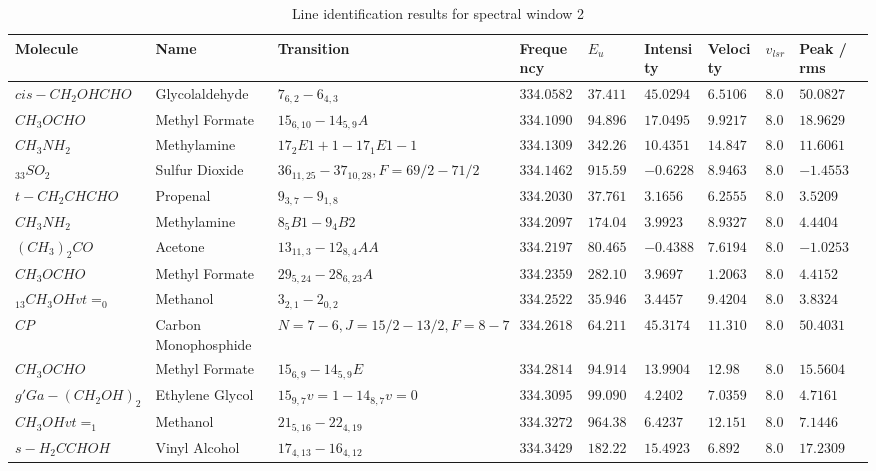 \documentclass{aa}
\begin{document}
   \begin{table}   
 \label{table:3}  
    \caption{Line identification results for spectral window 2}
    \tiny
    \centering    
    \begin{tabular}{l l l l l l l l l} 
    \hline     
    Molecule & Name &Transition & Frequency & $E_{u}$ & Intensity & Velocity & $v_{lsr}$ & Peak / rms\\ 
    \hline
$cis-CH_{2}OHCHO$ & Glycolaldehyde & $7_{6,2}-6_{4,3}$ & $334.05821$ & $37.4116$ & $45.0294$ & $6.5106$ & $8.0$ & $50.0827$\\
$CH_{3}OCHO$ & Methyl Formate & $15_{6,10}-14_{5,9}A$ & $334.10909$ & $94.8964$ & $17.0495$ & $9.9217$ & $8.0$ & $18.9629$\\
$CH_{3}NH_{2}$ & Methylamine & $17_{2}E1+1-17_{1}E1-1$ & $334.13094$ & $342.265$ & $10.4351$ & $14.8478$ & $8.0$ & $11.6061$\\
$_{33}SO_{2}$ & Sulfur Dioxide & $36_{11,25}-37_{10,28},F=69/2-71/2$ & $334.14626$ & $915.5991$ & $-0.6228$ & $8.9463$ & $8.0$ & $-1.4553$\\
$t-CH_{2}CHCHO$ & Propenal & $9_{3,7}-9_{1,8}$ & $334.20301$ & $37.7617$ & $3.1656$ & $6.2555$ & $8.0$ & $3.5209$\\
$CH_{3}NH_{2}$ & Methylamine & $8_{5}B1-9_{4}B2$ & $334.20979$ & $174.0493$ & $3.9923$ & $8.9327$ & $8.0$ & $4.4404$\\
$(CH_{3})_{2}CO$ & Acetone & $13_{11,3}-12_{8,4}AA$ & $334.21979$ & $80.4654$ & $-0.4388$ & $7.6194$ & $8.0$ & $-1.0253$\\
$CH_{3}OCHO$ & Methyl Formate & $29_{5,24}-28_{6,23}A$ & $334.23598$ & $282.1007$ & $3.9697$ & $1.2063$ & $8.0$ & $4.4152$\\
$_{13}CH_{3}OHvt=_{0}$ & Methanol & $3_{2,1}-2_{0,2}$ & $334.25221$ & $35.9468$ & $3.4457$ & $9.4204$ & $8.0$ & $3.8324$\\
$CP$ & Carbon Monophosphide & $N=7-6,J=15/2-13/2,F=8-7$ & $334.26182$ & $64.2111$ & $45.3174$ & $11.3104$ & $8.0$ & $50.4031$\\
$CH_{3}OCHO$ & Methyl Formate & $15_{6,9}-14_{5,9}E$ & $334.28144$ & $94.9147$ & $13.9904$ & $12.98$ & $8.0$ & $15.5604$\\
$g'Ga-(CH_{2}OH)_{2}$ & Ethylene Glycol & $15_{9,7}v=1-14_{8,7}v=0$ & $334.30955$ & $99.0907$ & $4.2402$ & $7.0359$ & $8.0$ & $4.7161$\\
$CH_{3}OHvt=_{1}$ & Methanol & $21_{5,16}-22_{4,19}$ & $334.32728$ & $964.3871$ & $6.4237$ & $12.1515$ & $8.0$ & $7.1446$\\
$s-H_{2}CCHOH$ & Vinyl Alcohol & $17_{4,13}-16_{4,12}$ & $334.34291$ & $182.2279$ & $15.4923$ & $6.892$ & $8.0$ & $17.2309$\\

\end{tabular}
\end{table}
\end{document}

